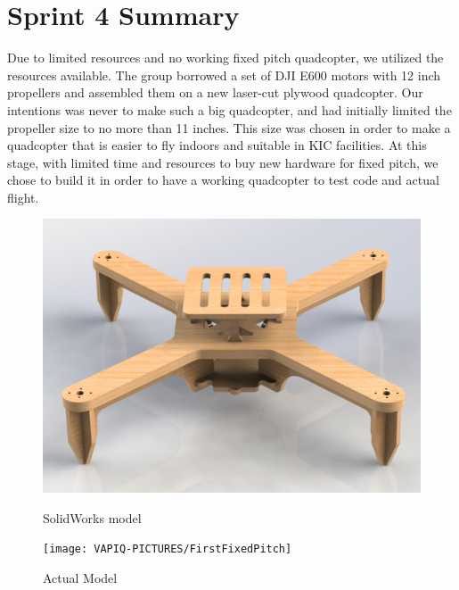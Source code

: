 \newpage
\section{Sprint 4 Summary}

Due to limited resources and no working fixed pitch quadcopter, we utilized the resources available. The group borrowed a set of DJI E600 motors with 12 inch propellers and assembled them on a new laser-cut plywood quadcopter. Our intentions was never to make such a big quadcopter, and had initially limited the propeller size to no more than 11 inches. This size was chosen in order to make a quadcopter that is easier to fly indoors and suitable in KIC facilities. At this stage, with limited time and resources to buy new hardware for fixed pitch, we chose to build it in order to have a working quadcopter to test code and actual flight.

\begin{figure}[h]
        \centering
         \begin{minipage}[b]{0.4\textwidth}
            \includegraphics[width = 1\textwidth]{VAPIQ-PICTURES/FixedPitchRender}
              \caption{SolidWorks model}
            \label{fig:testpic2}
        \end{minipage}
        \hfill
        \begin{minipage}[b]{0.4\textwidth}
            \texttt{[image: VAPIQ-PICTURES/FirstFixedPitch]}
            \caption{Actual Model}
            \label{fig:testpic3}
        \end{minipage}
\end{figure}

